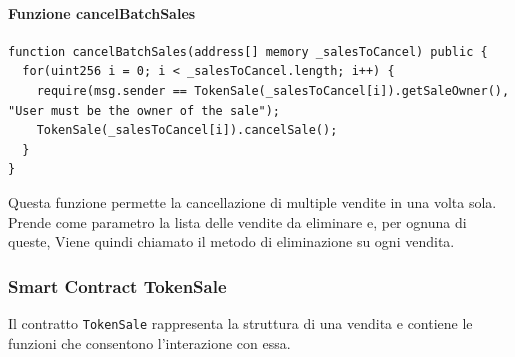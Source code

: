 \documentclass[a4paper]{article}
\begin{document}
        \paragraph{Funzione cancelBatchSales}
\begin{lstlisting}[style=ES6, title={Funzione cancelBatchSales()}]
function cancelBatchSales(address[] memory _salesToCancel) public {
  for(uint256 i = 0; i < _salesToCancel.length; i++) {
    require(msg.sender == TokenSale(_salesToCancel[i]).getSaleOwner(), "User must be the owner of the sale");
    TokenSale(_salesToCancel[i]).cancelSale();
  }
}\end{lstlisting}
        Questa funzione permette la cancellazione di multiple vendite in una volta sola. Prende come parametro la lista delle vendite da eliminare e, per ognuna di queste,
        Viene quindi chiamato il metodo di eliminazione su ogni vendita.
        \subsubsection{Smart Contract TokenSale}
        Il contratto \verb|TokenSale| rappresenta la struttura di una vendita e contiene le funzioni che consentono l'interazione con essa.
\end{document}

